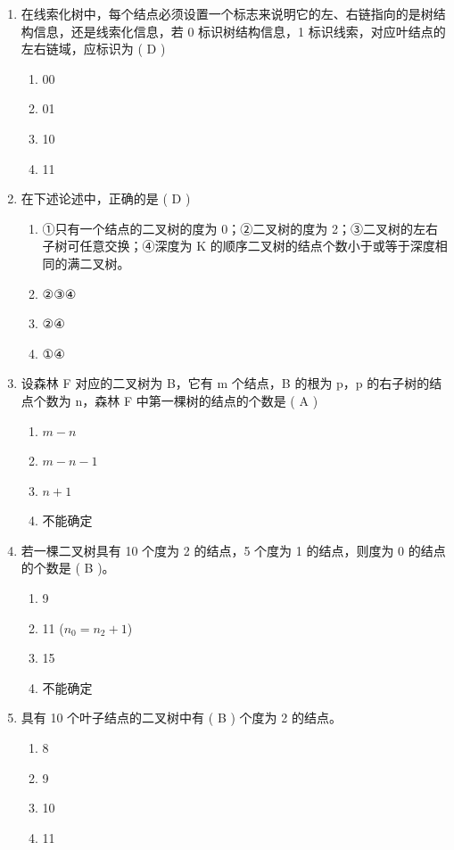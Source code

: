 \documentclass[12pt, a4paper]{article}
\begin{document}
\begin{enumerate}[label=\arabic*.]
    \item 在线索化树中，每个结点必须设置一个标志来说明它的左、右链指向的是树结构信息，还是线索化信息，若 0 标识树结构信息，1 标识线索，对应叶结点的左右链域，应标识为 ( D )
    \begin{enumerate}
        \item 00
        \item 01
        \item 10
        \item 11
    \end{enumerate}

    \item 在下述论述中，正确的是 ( D )
    \begin{enumerate}
        \item ①只有一个结点的二叉树的度为 0；②二叉树的度为 2；③二叉树的左右子树可任意交换；④深度为 K 的顺序二叉树的结点个数小于或等于深度相同的满二叉树。
        \item ②③④
        \item ②④
        \item ①④
    \end{enumerate}

    \item 设森林 F 对应的二叉树为 B，它有 m 个结点，B 的根为 p，p 的右子树的结点个数为 n，森林 F 中第一棵树的结点的个数是 ( A )
    \begin{enumerate}
        \item $m-n$
        \item $m-n-1$
        \item $n+1$
        \item 不能确定
    \end{enumerate}

    \item 若一棵二叉树具有 10 个度为 2 的结点，5 个度为 1 的结点，则度为 0 的结点的个数是 ( B )。
    \begin{enumerate}
        \item 9
        \item 11 ($n_0 = n_2 + 1$)
        \item 15
        \item 不能确定
    \end{enumerate}

    \item 具有 10 个叶子结点的二叉树中有 ( B ) 个度为 2 的结点。
    \begin{enumerate}
        \item 8
        \item 9
        \item 10
        \item 11
    \end{enumerate}


\end{enumerate}
\end{document}
